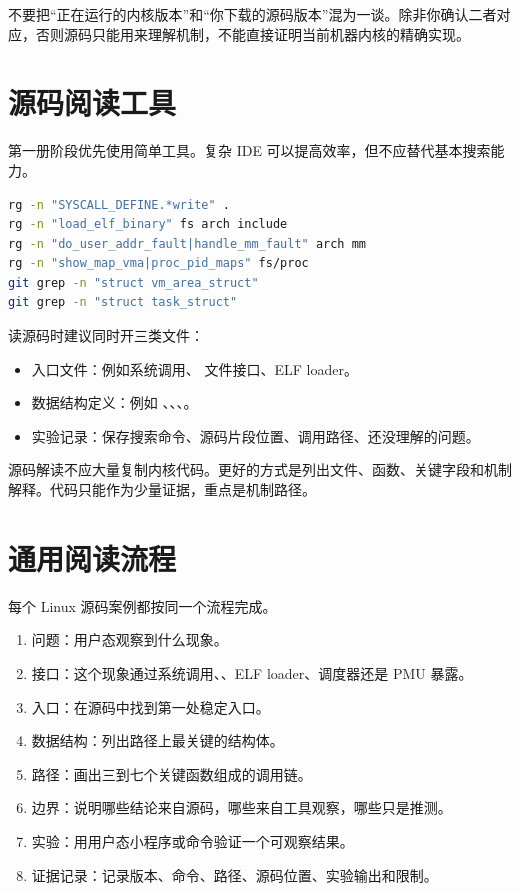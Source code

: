 \begin{warningbox}
不要把“正在运行的内核版本”和“你下载的源码版本”混为一谈。除非你确认二者对应，否则源码只能用来理解机制，不能直接证明当前机器内核的精确实现。
\end{warningbox}

\section{源码阅读工具}

第一册阶段优先使用简单工具。复杂 IDE 可以提高效率，但不应替代基本搜索能力。

\begin{lstlisting}[language=bash]
rg -n "SYSCALL_DEFINE.*write" .
rg -n "load_elf_binary" fs arch include
rg -n "do_user_addr_fault|handle_mm_fault" arch mm
rg -n "show_map_vma|proc_pid_maps" fs/proc
git grep -n "struct vm_area_struct"
git grep -n "struct task_struct"
\end{lstlisting}

读源码时建议同时开三类文件：

\begin{itemize}
  \item 入口文件：例如系统调用、 文件接口、ELF loader。
  \item 数据结构定义：例如 、、、。
  \item 实验记录：保存搜索命令、源码片段位置、调用路径、还没理解的问题。
\end{itemize}

源码解读不应大量复制内核代码。更好的方式是列出文件、函数、关键字段和机制解释。代码只能作为少量证据，重点是机制路径。

\section{通用阅读流程}

每个 Linux 源码案例都按同一个流程完成。

\begin{enumerate}
  \item 问题：用户态观察到什么现象。
  \item 接口：这个现象通过系统调用、、ELF loader、调度器还是 PMU 暴露。
  \item 入口：在源码中找到第一处稳定入口。
  \item 数据结构：列出路径上最关键的结构体。
  \item 路径：画出三到七个关键函数组成的调用链。
  \item 边界：说明哪些结论来自源码，哪些来自工具观察，哪些只是推测。
  \item 实验：用用户态小程序或命令验证一个可观察结果。
  \item 证据记录：记录版本、命令、路径、源码位置、实验输出和限制。
\end{enumerate}

